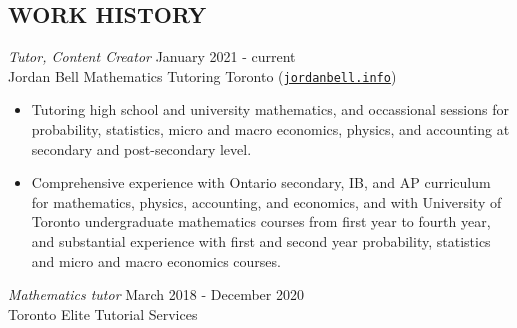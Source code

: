 \documentclass[margin, 10pt]{res} %
\begin{document}
\begin{resume}

 



 
\section{WORK HISTORY}

{\sl Tutor, Content Creator} \hfill January 2021 - current \\
Jordan Bell Mathematics Tutoring Toronto (\href{https://jordanbell.info/}{\texttt{jordanbell.info}})

\begin{itemize} \itemsep -2pt %
\item Tutoring high school and university mathematics, and occassional sessions for
probability, statistics, micro and macro economics, physics, and accounting at secondary and post-secondary level.

\item Comprehensive experience with Ontario secondary, IB, and AP curriculum for mathematics, physics, accounting, and economics, and with University of Toronto undergraduate mathematics courses from first year to fourth year, and substantial experience with first and second year probability, statistics and micro and macro economics courses.
\end{itemize}

{\sl Mathematics tutor} \hfill March 2018 - December 2020 \\
Toronto Elite Tutorial Services


\end{resume}
\end{document}
